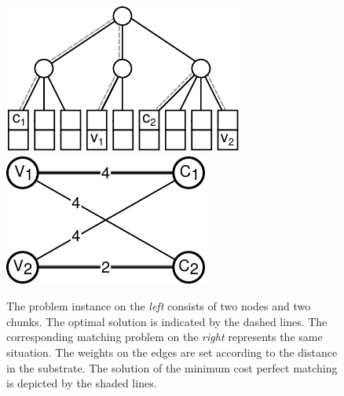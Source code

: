 \documentclass[9pt,twocolumn]{scrartcl}
\begin{document}
\begin{figure}[h]
\includegraphics[width = 0.49\columnwidth]{figs/matching_topology_simple}
\hfill
\includegraphics[width =0.4\columnwidth]{figs/matching_basic}
\caption{The problem instance on the \emph{left} consists of 
two nodes and two chunks. The
optimal solution is indicated by the dashed lines. The corresponding matching
problem on the \emph{right} represents the same situation. The weights on the edges
are set according to the distance in the substrate. The solution of the minimum
cost perfect matching is depicted by the shaded lines.}
\label{fig:matching_basic}
\end{figure}
\end{document}
